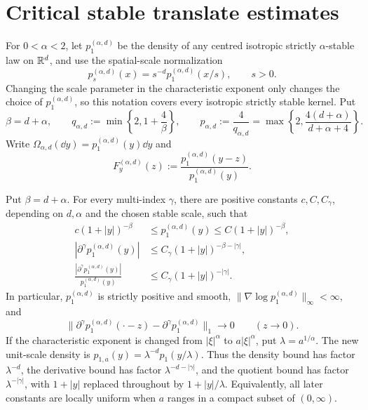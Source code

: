 \section{Critical stable translate estimates}

For \(0<\alpha<2\), let \(p_1^{(\alpha,d)}\) be the density of any
centred isotropic strictly \(\alpha\)-stable law on \(\mathbb{R}^d\), and use the
spatial-scale normalization
\[
 p_s^{(\alpha,d)}(x)=s^{-d}p_1^{(\alpha,d)}(x/s),\qquad s>0.
\]
Changing the scale parameter in the characteristic exponent only changes
the choice of \(p_1^{(\alpha,d)}\), so this notation covers every isotropic
strictly stable kernel.  Put
\begin{equation}\label{eq:stable-critical-exponents}
 \beta=d+\alpha,\qquad
 q_{\alpha,d}:=\min\left\{2,1+\frac4\beta\right\},\qquad
 p_{\alpha,d}:=\frac4{q_{\alpha,d}}
 =\max\left\{2,\frac{4(d+\alpha)}{d+\alpha+4}\right\}.
\end{equation}
Write \(\Omega_{\alpha,d}(\dd y)=p_1^{(\alpha,d)}(y)\dd y\) and
\[
F_y^{(\alpha,d)}(z)
:=\frac{p_1^{(\alpha,d)}(y-z)}{p_1^{(\alpha,d)}(y)}.
\]

\begin{proposition}
\label{prop:stable-kernel-input-package}
Put \(\beta=d+\alpha\).  For every multi-index \(\gamma\), there are positive
constants \(c,C,C_\gamma\), depending on \(d,\alpha\) and the chosen stable
scale, such that
\begin{align}
 c(1+|y|)^{-\beta}&\le p_1^{(\alpha,d)}(y)
 \le C(1+|y|)^{-\beta},\label{eq:stable-input-density}\\
 |\partial^\gamma p_1^{(\alpha,d)}(y)|
 &\le C_\gamma(1+|y|)^{-\beta-|\gamma|},\label{eq:stable-input-derivative}\\
 \frac{|\partial^\gamma p_1^{(\alpha,d)}(y)|}
 {p_1^{(\alpha,d)}(y)}
 &\le C_\gamma(1+|y|)^{-|\gamma|}.
 \label{eq:stable-input-derivative-quotient}
\end{align}
In particular, \(p_1^{(\alpha,d)}\) is strictly positive and smooth,
\(\|\nabla\log p_1^{(\alpha,d)}\|_\infty<\infty\), and
\begin{equation}\label{eq:stable-input-translation-continuity}
 \|\partial^\gamma p_1^{(\alpha,d)}(\mathord\cdot-z)
       -\partial^\gamma p_1^{(\alpha,d)}\|_1\longrightarrow0
 \qquad(z\to0).
\end{equation}
If the characteristic exponent is changed from \(|\xi|^\alpha\) to
\(a|\xi|^\alpha\), put \(\lambda=a^{1/\alpha}\).  The new unit-scale density
is \(p_{1,a}(y)=\lambda^{-d}p_1(y/\lambda)\).  Thus the density bound has
factor \(\lambda^{-d}\), the derivative bound has factor
\(\lambda^{-d-|\gamma|}\), and the quotient bound has factor
\(\lambda^{-|\gamma|}\), with \(1+|y|\) replaced throughout by
\(1+|y|/\lambda\).  Equivalently, all later
constants are locally uniform when \(a\) ranges in a compact subset of
\((0,\infty)\).
\end{proposition}

